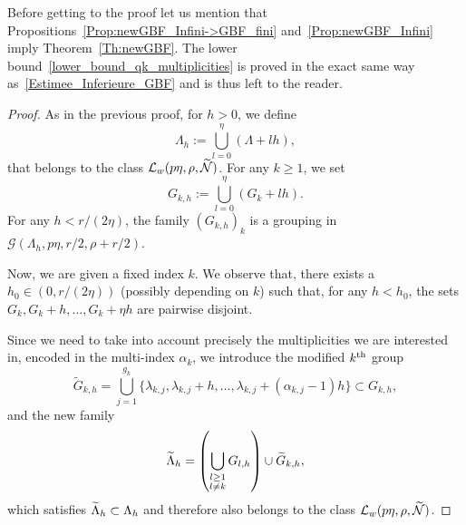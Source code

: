 \documentclass[10pt]{amsart}
\theoremstyle{definition}\newtheorem{defi}[theo]{Definition}\newtheorem{rema}[theo]{Remark}\newtheorem{exam}[theo]{Example}\newtheorem{exem}[theo]{Example}\newtheorem{nota}[theo]{Notation}
\newcommand{\n}{g}
\newcommand{\LL}{\mathcal{L}}
\newcommand{\NN}{\mathcal{N}}
\let\oldtilde\tilde
\renewcommand*{\tilde}[1]{\mathchoice{\widetilde{#1}}{\widetilde{#1}}{\oldtilde{#1}}{\oldtilde{#1}}}\let\oldexists\exists
\renewcommand*{\exists}{\mathrel{\oldexists}}
\begin{document}
Before getting to the proof let us mention that Propositions~\ref{Prop:newGBF_Infini->GBF_fini} and~\ref{Prop:newGBF_Infini} imply Theorem~\ref{Th:newGBF}. The lower bound~\eqref{lower_bound_qk_multiplicities} is proved in the exact same way as~\eqref{Estimee_Inferieure_GBF} and is thus left to the reader.
\begin{proof}
As in the previous proof, for $h>0$, we define
\[
\Lambda_h :=\bigcup_{l=0}^{\eta} (\Lambda + l h),
\]
that belongs to the class $\LL_w(p\eta,\rho,\tilde{\NN})$. For any $k \geq 1$, we set
\[
G_{k,h} := \bigcup_{l=0}^{\eta} (G_k + l h).
\]
For any $h<r/(2\eta)$, the family $(G_{k,h})_k$ is a grouping in $\mathcal{G}(\Lambda_h, p\eta,r/2,\rho+r/2)$.

Now, we are given a fixed index $k$. We observe that, there exists a $h_0\in(0,r/(2\eta))$ (possibly depending on $k$) such that, for any $h<h_0$, the sets $G_k, G_k+h, \dotsc, G_k+\eta h$ are pairwise disjoint.

Since we need to take into account precisely the multiplicities we are interested in, encoded in the multi-index $\alpha_k$, we introduce the modified $k^{\rm th}$ group
\goodbreak
\begingroup
\[
\widetilde{G}_{k,h} = \bigcup_{j=1}^{\n_k} \{\lambda_{k,j}, \lambda_{k,j} +h, \dotsc,\lambda_{k,j}+(\alpha_{k,j}-1) h \} \subset G_{k,h},
\]
and the new family
\[
\tilde{\Lambda}_h = \left(\bigcup_{\substack{l\geq 1\\l\neq k}} G_{l,h} \right) \cup \widetilde{G}_{k,h},
\]
\endgroup
which satisfies $\tilde{\Lambda}_h\subset \Lambda_h$ and therefore also belongs to the class $\LL_w(p\eta,\rho,\tilde{\NN})$.


\end{proof}
\end{document}
